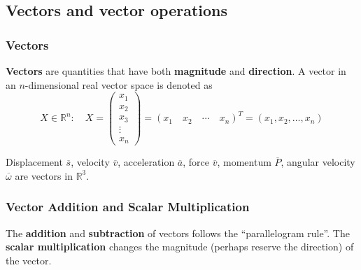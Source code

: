\subsection{Vectors and vector operations}
\begin{frame}
\frametitle{Vectors}
\begin{definition}
\textbf{\alert{Vectors}} are quantities that have both \textbf{magnitude} and \textbf{direction}.
A vector in an $n$-dimensional real vector space is denoted as
\[
X\in\mathbb{R}^{n}:\quad X=\left(\begin{matrix}x_{1}\\x_{2}\\x_{3}\\\vdots\\x_{n}\end{matrix}\right)=(x_{1}\quad x_{2}\quad \cdots\quad x_{n})^{T}=(x_{1},x_{2},\dots,x_{n})
\]
\end{definition}
\begin{example}
Displacement $\overline{s}$, velocity $\overline{v}$, acceleration $\overline{a}$, force $\overline{v}$, momentum $\overline{P}$, angular velocity $\overline{\omega}$ are vectors in $\mathbb{R}^3$.
\end{example}
\end{frame}
\begin{frame}
\frametitle{Vector Addition and Scalar Multiplication}
\begin{definition}
The \textbf{\alert{addition}} and \textbf{subtraction} of vectors follows the ``parallelogram rule''. The \textbf{\alert{scalar multiplication}} changes the magnitude (perhaps reserve the direction) of the vector.
\end{definition}
\begin{figure}
\centering
{}
\end{figure}
\end{frame}
